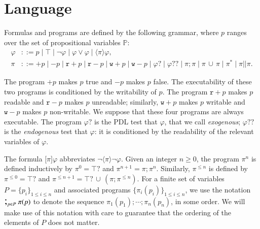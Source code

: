 \documentclass{llncs}
\newcommand{\atm}{x}
\newcommand{\pll}{ {||} }							%
\newcommand{\testendo}{?\!\!?}			%
\newcommand{\testpdl}{?}				%
\newcommand{\ah}[1]{\footnote{\textbf{AH:} #1}}
\newcommand{\assgn}[2]{{#1 {:=} #2}}
\newcommand{\assgntopR}[1]{{\mathtt r {+} #1}}
\newcommand{\assgnbotR}[1]{{\mathtt r {-} #1}}
\newcommand{\assgntopW}[1]{{\mathtt w {+} #1}}
\newcommand{\assgnbotW}[1]{{\mathtt w {-} #1}}
\newcommand{\assgntopV}[1]{{\mathtt {+} #1}}
\newcommand{\assgnbotV}[1]{{\mathtt {-} #1}}
\newcommand{\ifthen}[2]{\mathbf{if}\ #1 \ \mathbf{then}\ #2}
\newcommand{\lbox}[1]{ \big[ #1 \big] }
\newcommand{\ldia}[1]{ \big\langle #1 \big\rangle}
\newcommand{\ndet}{\,{\cup}\,}
\renewcommand{\phi}{\varphi}
\newcommand{\propset}{\mathbb P}
\newcommand{\seqseq}[1]{ \text{\Large ;}_{#1} ~ }
\begin{document}
\section{Language}\label{sec:language}

Formulas and programs are defined by the following grammar,
where $p$ ranges over the set of propositional variables $\propset$:
\begin{align*}
\phi & ::= p \mid \top  \mid  \lnot \phi  \mid  \phi \lor \phi  \mid  \ldia \pi \phi ,
\\
\pi & ::= \assgntopV p \mid \assgnbotV p \mid
		\assgntopR p \mid \assgnbotR p \mid
		\assgntopW p \mid \assgnbotW p \mid
			\phi \testpdl \mid 
			\phi \testendo \mid 
			\pi ; \pi \mid \pi \ndet \pi \mid 
			\pi^\ast \mid \pi \pll \pi .
\end{align*}

The program $\assgntopV p$ makes $p$ true and $\assgnbotV p $ makes $p$ false. 
The executability of these two programs is conditioned by the writability of $p$. 
%
The program $\assgntopR p$ makes $p$ readable and 
$\assgnbotR p $ makes $p$ unreadable; similarly,
$\assgntopW p$ makes $p$ writable and 
$\assgnbotW p$ makes $p$ non-writable.
We suppose that these four programs are always executable. 
The program $\phi \testpdl$ is the PDL test that $\phi$, that we call \emph{exogenous};
$\phi \testendo $ is the \emph{endogenous} test that $\phi$: it is 
conditioned by the readability of the relevant variables of $\phi$. 

The formula $\lbox \pi \phi$ abbreviates $\lnot \ldia \pi \lnot \phi$.
Given an integer $n \geq 0$, the program $\pi^n$ is defined inductively by 
$\pi^0 = \top \testpdl $ and 
$\pi^{n+1} = \pi ; \pi^n $. 
Similarly, $\pi^{\leq n}$ is defined by 
$\pi^{\leq 0} = \top \testpdl $ and 
$\pi^{\leq n+1} = \top \testpdl \ndet (\pi ; \pi^{\leq n}) $. 
For a finite set of variables 
$P = \{p_i\}_{1 \leq  i \leq n}$ 
and associated programs 
$\{ \pi_i(p_i)\}_{1 \leq  i \leq n}$,
we use the notation
$\seqseq{p \in P} \pi(p)$ to denote the sequence
$ \pi_1(p_1) ; \cdots ; \pi_n(p_n)$, in some order. 
We will make use of this notation with care to guarantee that the ordering of the elements of $P$ does not matter. 
\end{document}
